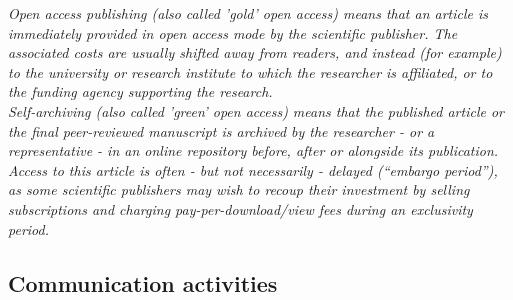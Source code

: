 {\begin{itemize}
\begin{itemize}
\end{itemize} 
\emph{Open access publishing (also called 'gold' open access) means that an article is immediately provided in open access mode by the scientific publisher. The associated costs are usually shifted away from readers, and instead (for example) to the university or research institute to which the researcher is affiliated, or to the funding agency supporting the research.}\\
\emph{Self-archiving (also called 'green' open access) means that the published article or the final peer-reviewed manuscript is archived by the researcher - or a representative - in an online repository before, after or alongside its publication. Access to this article is often - but not necessarily - delayed (``embargo period''), as some scientific publishers may wish to recoup their investment by selling subscriptions and charging pay-per-download/view fees during an exclusivity period.}
\end{itemize}
}

\subsection{Communication activities}
\label{sec:communication}
